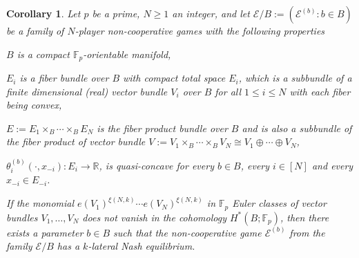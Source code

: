 \documentclass[a4paper,11pt,reqno,english]{amsart}
\theoremstyle{plain}
\newtheorem{corollary}[theorem]{Corollary}
\theoremstyle{definition}
\newcommand{\Ecal}{\mathcal{E}}
\begin{document}
\begin{corollary}\label{cor:Main_result_01_02}
	Let $p$ be a prime, $N\geq 1$ an integer, and let $\Ecal/B:=(\Ecal^{(b)}:b\in B)$ be a family of $N$-player non-cooperative games with the following properties
	\begin{compactitem}[\quad --]
		\item $B$ is a compact $\mathbb{F}_p$-orientable manifold,
		\item $E_i$ is a fiber bundle over $B$ with compact total space $E_i$, which is a subbundle of a finite dimensional (real) vector bundle $V_i$ over $B$ for all $1\leq i\leq N$ with each fiber being convex,
		\item $E:=E_1\times_B\cdots \times_BE_N$ is the fiber product bundle over $B$ and is also a subbundle of the fiber product of vector bundle $V:= V_1\times_B\cdots\times_B V_N\cong V_1\oplus\cdots\oplus V_N$,
		\item $\theta_i^{(b)}(\cdot, x_{-i})\colon E_i\longrightarrow\mathbb{R}$, is quasi-concave for every $b\in B$, every $i\in [N]$ and every $x_{-i}\in E_{-i}$.
	\end{compactitem}

	\smallskip\noindent
	If the monomial $e(V_1)^{\xi(N,k)}\cdots e(V_N)^{\xi(N,k)}$ in $\mathbb{F}_p$ Euler classes of vector bundles $V_1,\dots, V_N$ does not vanish in the cohomology $H^*(B;\mathbb{F}_p)$, then there exists a parameter $b\in B$ such that the non-cooperative game $\Ecal^{(b)}$ from the family $\Ecal/B$ has a $k$-lateral Nash equilibrium.
\end{corollary}
\end{document}
